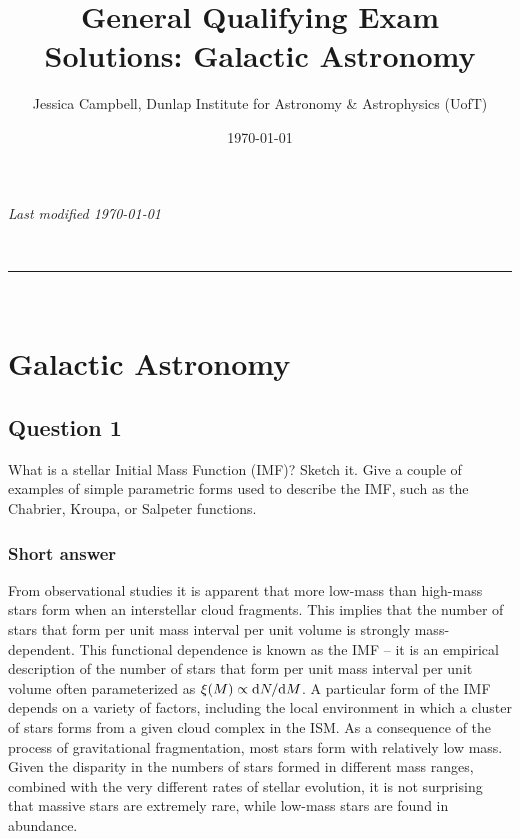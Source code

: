 \documentclass[a4paper,10pt]{article}
\makeatletter
\newcommand{\linia}{\rule{\linewidth}{0.5pt}}
\renewcommand{\maketitle}{
\begin{center}
\vspace{2ex}
{\huge \textsc{\@title}}
\vspace{1ex}
\\
\linia\\
\@author
\vspace{4ex}
\end{center}
}
\makeatother
\begin{document}
\hfill{\textit{Last modified \today}}
\title{General Qualifying Exam Solutions: Galactic Astronomy}
\author{Jessica Campbell, Dunlap Institute for Astronomy \& Astrophysics (UofT)}
\date{\today}
\maketitle

\tableofcontents



%
%
%
%

\newpage
\section{Galactic Astronomy}


\subsection{Question 1}

What is a stellar Initial Mass Function (IMF)? Sketch it. Give a couple of examples of simple parametric forms used to describe the IMF, such as the Chabrier, Kroupa, or Salpeter functions.

\subsubsection{Short answer}

From observational studies it is apparent that more low-mass than high-mass stars form when an interstellar cloud fragments. This implies that the number of stars that form per unit mass interval per unit volume is strongly mass-dependent. This functional dependence is known as the IMF -- it is an empirical description of the number of stars that form per unit mass interval per unit volume often parameterized as $\xi(M)\propto{\rm d}N/{\rm d}M$. A particular form of the IMF depends on a variety of factors, including the local environment in which a cluster of stars forms from a given cloud complex in the ISM. As a consequence of the process of gravitational fragmentation, most stars form with relatively low mass. Given the disparity in the numbers of stars formed in different mass ranges, combined with the very different rates of stellar evolution, it is not surprising that massive stars are extremely rare, while low-mass stars are found in abundance.
\end{document}
